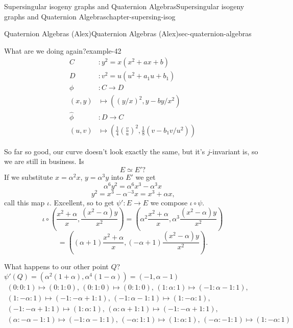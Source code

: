 \documentclass[oneside,10pt,]{book}
\numberwithin{equation}{section}
\newcommand{\amp}{&}
\begin{document}
\begin{chapterptx}{Supersingular isogeny graphs and Quaternion Algebras}{}{Supersingular isogeny graphs and Quaternion Algebras}{}{}{chapter-supersing-isog}
\begin{sectionptx}{Quaternion Algebras (Alex)}{}{Quaternion Algebras (Alex)}{}{}{sec-quaternion-algebras}
\begin{introduction}{}
\begin{example}{What are we doing again?}{example-42}
\begin{align*}
C\amp\colon y^2 = x(x^2+ax+b)\\
D\amp\colon v^2 = u(u^2+a_1u+b_1)\\
\phi\amp\colon C\to D\\
(x,y) \amp\mapsto ((y/x)^2 , y-by/x^2)\\
\hat\phi\amp\colon D\to C\\
(u,v) \amp\mapsto \left(\frac14\left(\frac vu\right)^2 ,\frac18( v-b_1 v/u^2)\right)
\end{align*}
%
\par
\hypertarget{p-872}{}%
So far so good, our curve doesn't look exactly the same, but it's \(j\)-invariant is, so we are still in business. Is%
\begin{equation*}
E \simeq E'\text{?}
\end{equation*}
If we substitute \(x= \alpha^2 x\), \(y = \alpha ^3 y\) into \(E'\) we get%
\begin{equation*}
\alpha^6 y^2 = \alpha^6 x^3 - \alpha^3 x
\end{equation*}
%
\begin{equation*}
y^2 = x^3 - \alpha^{-3} x = x^3 +\alpha x\text{,}
\end{equation*}
call this map \(\iota\). Excellent, so to get \(\psi' \colon E\to E\) we compose \(\iota\circ \psi\).%
\begin{equation*}
\iota \circ\left( \frac{x^2  + \alpha}{x}, \frac{(x^2 - \alpha )y}{x^2}\right)  = \left( \alpha^2\frac{x^2  + \alpha}{x}, \alpha^3\frac{(x^2 - \alpha )y}{x^2}\right)
\end{equation*}
%
\begin{equation*}
= \left( (\alpha+  1)\frac{x^2  + \alpha}{x}, ( -\alpha  + 1)\frac{(x^2 - \alpha )y}{x^2}\right)\text{.}
\end{equation*}
%
\par
\hypertarget{p-873}{}%
What happens to our other point \(Q\)? \(\psi'(Q) = (\alpha^2(1+\alpha), \alpha^4(1-\alpha)) =(-1, \alpha - 1)\)%
\begin{gather*}
(0 : 0 : 1) \mapsto (0 : 1 : 0),\, (0 : 1 : 0) \mapsto (0 : 1 : 0),\, (1 : \alpha : 1) \mapsto (-1 : \alpha -1 : 1),\\
(1 : -\alpha : 1) \mapsto (-1 : -\alpha + 1 : 1),\, (-1 : \alpha -1 : 1) \mapsto (1 : -\alpha : 1),\\
(-1 : -\alpha + 1 : 1) \mapsto (1 : \alpha : 1),\, (\alpha : \alpha + 1 : 1) \mapsto (-1 : -\alpha + 1 : 1),\\
(\alpha : -\alpha -1 : 1) \mapsto (-1 : \alpha -1 : 1),\, (-\alpha : 1 : 1) \mapsto (1 : \alpha : 1),\, (-\alpha : -1 : 1) \mapsto (1 : -\alpha : 1)

\end{gather*}
\end{example}
\end{introduction}
\end{sectionptx}
\end{chapterptx}
\end{document}
